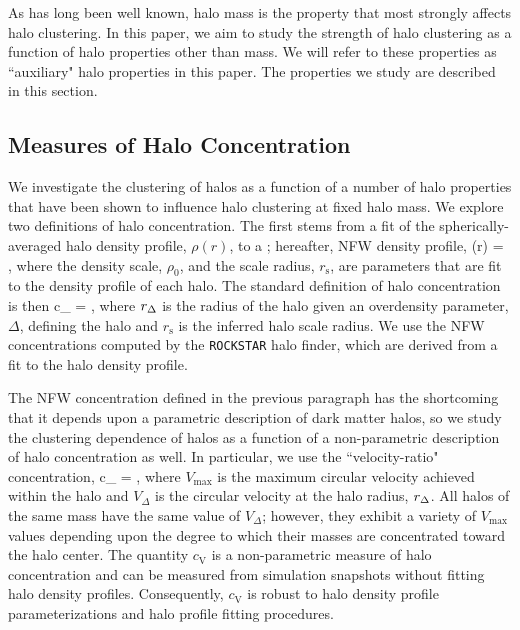 \documentclass[usenatbib]{mnras}
\begin{document}
As has long been well known, halo mass is the property that most strongly affects halo clustering. In 
this paper, we aim to study the strength of halo clustering as a function of halo properties other than 
mass. We will refer to these properties as ``auxiliary" halo properties in this paper. The properties 
we study are described in this section.

\subsection{Measures of Halo Concentration}

We investigate the clustering of halos as a function of a number of halo properties 
that have been shown to influence halo clustering at fixed halo mass. We explore 
two definitions of halo concentration. The first stems from a fit of the spherically-averaged 
halo density profile, $\rho(r)$, to a \citet{navarro_etal97}; hereafter, NFW density profile, 
%
\beq
\rho(r) = ,
\eeq
%
where the density scale, $\rho_0$, and the scale radius, $r_{\mathrm{s}}$, are parameters 
that are fit to the density profile of each halo. The standard definition of halo concentration is then 
\beq
c_{} = ,
\eeq
where $r_{\Delta}$ is the radius of the halo given an overdensity parameter, $\Delta$, defining the halo 
and $r_{\mathrm{s}}$ is the inferred halo scale radius. We use the NFW concentrations computed by the 
{\tt ROCKSTAR} halo finder, which are derived from a fit to the halo density profile.  


The NFW concentration defined in the previous paragraph has the shortcoming that it 
depends upon a parametric description of dark matter halos, so we study the clustering dependence 
of halos as a function of a non-parametric description of halo concentration as well. In particular, we 
use the ``velocity-ratio" concentration,
\beq
c_{} = , 
\eeq
where $V_{\mathrm{max}}$ is the maximum circular velocity achieved within the halo and $V_{\Delta}$ is 
the circular velocity at the halo radius, $r_{\Delta}$. All halos of the same mass have the same value of $V_{\Delta}$; however, 
they exhibit a variety of $V_{\mathrm{max}}$ values depending upon the degree to which their masses are concentrated toward 
the halo center. The quantity $c_{\mathrm{V}}$ is a non-parametric measure of halo concentration and can be measured from 
simulation snapshots without fitting halo density profiles. Consequently, $c_{\mathrm{V}}$ is robust to halo density 
profile parameterizations and halo profile fitting procedures. 
\end{document}

